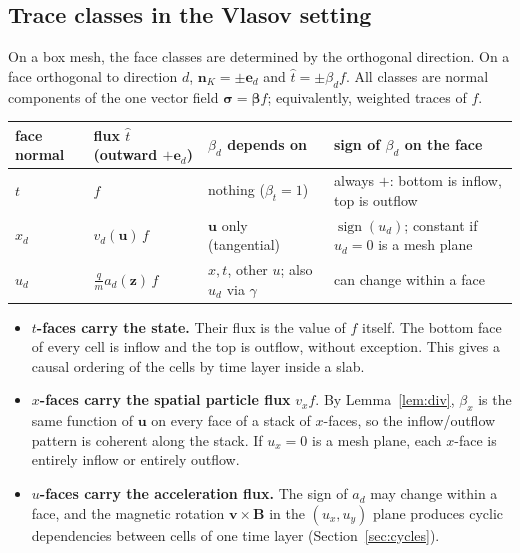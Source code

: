 \documentclass[11pt]{article}
\theoremstyle{remark}
\theoremstyle{definition}
\newcommand{\bbeta}{\boldsymbol{\beta}}
\newcommand{\bn}{\boldsymbol{n}}
\newcommand{\bz}{\boldsymbol{z}}
\newcommand{\bu}{\boldsymbol{u}}
\newcommand{\bv}{\boldsymbol{v}}
\newcommand{\bB}{\boldsymbol{B}}
\newcommand{\bsigma}{\boldsymbol{\sigma}}
\newcommand{\that}{\hat{t}}
\begin{document}
\subsection{Trace classes in the Vlasov setting}

On a box mesh, the face classes are determined by the orthogonal direction.  On a face orthogonal to direction $d$,
$\bn_K=\pm\mathbf e_d$ and $\that=\pm\beta_d f$.  All classes are normal components of the one vector field
$\bsigma=\bbeta f$; equivalently, weighted traces of $f$.

\begin{center}
\begin{tabular}{@{}llp{1.45in}p{2.0in}@{}}
\toprule
face normal & flux $\that$ (outward $+\mathbf e_d$) & $\beta_d$ depends on & sign of $\beta_d$ on the face\\
\midrule
$t$ & $f$ & nothing ($\beta_t=1$) & always $+$: bottom is inflow, top is outflow \\
$x_d$ & $v_d(\bu)\,f$ & $\bu$ only (tangential) & $\operatorname{sign}(u_d)$; constant if $u_d=0$ is a mesh plane\\
$u_d$ & $\frac{q}{m}a_d(\bz)\,f$ & $x,t$, other $u$; also $u_d$ via $\gamma$ & can change within a face \\
\bottomrule
\end{tabular}
\end{center}

\begin{itemize}
  \item \textbf{$t$-faces carry the state.}  Their flux is the value of $f$ itself.  The bottom face of every cell is
        inflow and the top is outflow, without exception.  This gives a causal ordering of the cells by time layer
        inside a slab.
  \item \textbf{$x$-faces carry the spatial particle flux} $v_x f$.  By Lemma~\ref{lem:div}, $\beta_x$ is the same
        function of $\bu$ on every face of a stack of $x$-faces, so the inflow/outflow pattern is coherent along the
        stack.  If $u_x=0$ is a mesh plane, each $x$-face is entirely inflow or entirely outflow.
  \item \textbf{$u$-faces carry the acceleration flux.}  The sign of $a_d$ may change within a face, and the magnetic
        rotation $\bv\times\bB$ in the $(u_x,u_y)$ plane produces cyclic dependencies between cells of one time
        layer (Section~\ref{sec:cycles}).
\end{itemize}

\end{document}
